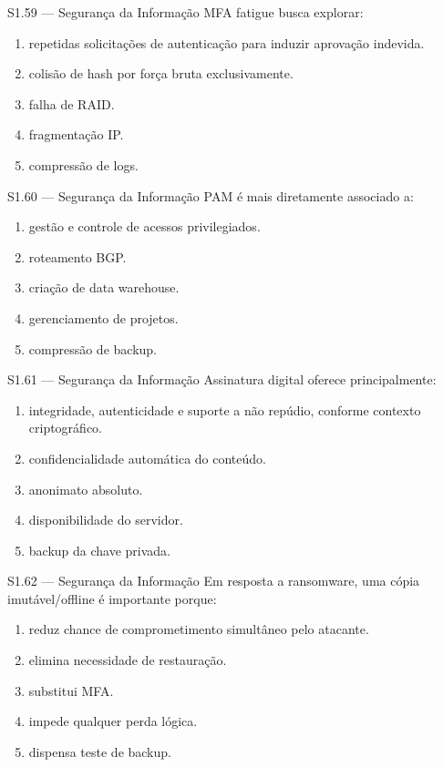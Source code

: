 \begin{questao}{S1.59 — Segurança da Informação}
MFA fatigue busca explorar:
\begin{enumerate}[label=\Alph*)]\item repetidas solicitações de autenticação para induzir aprovação indevida.\item colisão de hash por força bruta exclusivamente.\item falha de RAID.\item fragmentação IP.\item compressão de logs.\end{enumerate}
\end{questao}

\begin{questao}{S1.60 — Segurança da Informação}
PAM é mais diretamente associado a:
\begin{enumerate}[label=\Alph*)]\item gestão e controle de acessos privilegiados.\item roteamento BGP.\item criação de data warehouse.\item gerenciamento de projetos.\item compressão de backup.\end{enumerate}
\end{questao}

\begin{questao}{S1.61 — Segurança da Informação}
Assinatura digital oferece principalmente:
\begin{enumerate}[label=\Alph*)]\item integridade, autenticidade e suporte a não repúdio, conforme contexto criptográfico.\item confidencialidade automática do conteúdo.\item anonimato absoluto.\item disponibilidade do servidor.\item backup da chave privada.\end{enumerate}
\end{questao}

\begin{questao}{S1.62 — Segurança da Informação}
Em resposta a ransomware, uma cópia imutável/offline é importante porque:
\begin{enumerate}[label=\Alph*)]\item reduz chance de comprometimento simultâneo pelo atacante.\item elimina necessidade de restauração.\item substitui MFA.\item impede qualquer perda lógica.\item dispensa teste de backup.\end{enumerate}
\end{questao}

